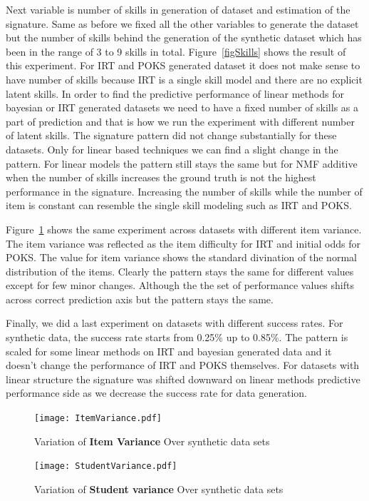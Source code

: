 Next variable is number of skills in generation of dataset and estimation of the signature. Same as before we fixed all the other variables to generate the dataset but the number of skills behind the generation of the synthetic dataset which has been in the range of 3 to 9 skills in total. Figure~\ref{figSkills} shows the result of this experiment. For IRT and POKS generated dataset it does not make sense to have number of skills because IRT is a single skill model and there are no explicit latent skills. In order to find the predictive performance of linear methods for bayesian or IRT generated datasets we need to have a fixed number of skills as a part of prediction and that is how we run the experiment with different number of latent skills. The signature pattern did not change substantially for these datasets. Only for linear based techniques we can find a slight change in the pattern. For linear models the pattern still stays the same but for NMF additive when the number of skills increases the ground truth is not the highest performance in the signature. Increasing the number of skills while the number of item is constant can resemble the single skill modeling such as IRT and POKS. 

Figure~\ref{figitemVar} shows the same experiment across datasets with different item variance. The item variance was reflected as the item difficulty for IRT and initial odds for POKS. The value for item variance shows the standard divination of the normal distribution of the items. Clearly the pattern stays the same for different values except for few minor changes. Although the the set of performance values shifts across correct prediction axis but the pattern stays the same.

Finally, we did a last experiment on datasets with different success rates. For synthetic data, the success rate starts from 0.25\% up to 0.85\%. The pattern is scaled for some linear methods on IRT and bayesian generated data and it doesn't change the performance of IRT and POKS themselves. For datasets with linear structure the signature was shifted downward on linear methods predictive performance side as we decrease the success rate for data generation.


\begin{figure}
  \centering
    \texttt{[image: ItemVariance.pdf]}
\caption{Variation of \textbf{Item Variance} Over synthetic data sets}
\label{figitemVar}
\end{figure}

\begin{figure}
  \centering
    \texttt{[image: StudentVariance.pdf]}
\caption{Variation of \textbf{Student variance} Over synthetic data sets}
\label{figStudentVar}
\end{figure}


